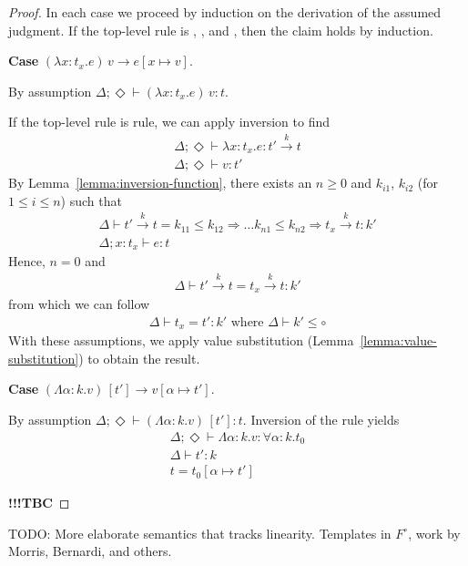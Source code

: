 \documentclass{article}
\newcommand{\ONE}{\circ}
\newcommand{\TASS}[1]{#1\colon\!}
\newcommand{\TVAR}{\alpha}
\newcommand{\TALL}[2]{\forall\TASS{#1}#2.}
\newcommand{\LAM}[2]{\lambda\TASS{#1}#2.}
\newcommand{\APP}[1]{#1\,}
\newcommand{\TLAM}[2]{\Lambda\TASS{#1}#2.}
\newcommand{\TAPP}[2]{#1\,[#2]}
\newcommand{\KENV}{\Delta}
\newcommand{\TENVEMPTY}{\Diamond}
\newcommand\stepsto{\longrightarrow}
\begin{document}
\begin{proof}
  In each case we proceed by induction on the derivation of the
  assumed judgment.  If the top-level rule is ,
  , and , then the claim holds by
  induction.

  \textbf{Case} ${\APP{(\LAM x {t_x} e)}v \stepsto e[x \mapsto v]}$.

  By assumption $\KENV;\TENVEMPTY \vdash \APP{(\LAM x {t_x} e)}v : t$.


  If the top-level rule is  rule, we can apply inversion to find
  \begin{gather}
    \label{eq:1}
    \KENV; \TENVEMPTY \vdash \LAM x {t_x} e : t' \stackrel{k}\to t
    \\
    \label{eq:2}
    \KENV; \TENVEMPTY \vdash v : t'
  \end{gather}
  By Lemma~\ref{lemma:inversion-function}, there exists an $n\ge0$ and $k_{i1}$, $k_{i2}$ (for $1\le i\le n$) such that
  \begin{gather}
    \KENV \vdash t' \stackrel{k}\to t = k_{11}\le k_{12}\Rightarrow \dots k_{n1}\le k_{n2} \Rightarrow t_x \stackrel{k}\to t : k'
    \\
    \KENV; \TASS x{t_x} \vdash e : t
  \end{gather}
  Hence, $n=0$ and 
  \begin{gather}
    \KENV \vdash t' \stackrel{k}\to t = t_x \stackrel{k}\to t : k'
  \end{gather}
  from which we can follow
  \begin{gather}
    \label{eq:3}
    \KENV \vdash t_x = t' : k' \text{ where } \KENV \vdash k' \le \ONE
  \end{gather}
  With these assumptions, we apply value substitution
  (Lemma~\ref{lemma:value-substitution}) to obtain the result.

  \textbf{Case} $\TAPP{(\TLAM \TVAR k v)}{t'} \stepsto v[\TVAR \mapsto t']$.

  By assumption
  $\KENV;\TENVEMPTY \vdash \TAPP{(\TLAM \TVAR k v)}{t'} :
  t$. Inversion of the  rule yields
  \begin{gather}
    \KENV; \TENVEMPTY \vdash \TLAM \TVAR k v : \TALL\TVAR k t_0 \\
    \KENV \vdash t' : k \\
    t = t_0 [\TVAR\mapsto t']
  \end{gather}

  \textbf{!!!TBC}
\end{proof}

TODO: More elaborate semantics that tracks linearity.
Templates in $F^{\ONE}$, work by Morris, Bernardi, and others.
\end{document}
